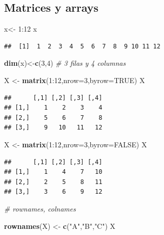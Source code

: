 \documentclass[]{article}
\newenvironment{Shaded}{\begin{snugshade}}{\end{snugshade}}
\newcommand{\KeywordTok}[1]{\textcolor[rgb]{0.13,0.29,0.53}{\textbf{{#1}}}}
\newcommand{\DataTypeTok}[1]{\textcolor[rgb]{0.13,0.29,0.53}{{#1}}}
\newcommand{\DecValTok}[1]{\textcolor[rgb]{0.00,0.00,0.81}{{#1}}}
\newcommand{\StringTok}[1]{\textcolor[rgb]{0.31,0.60,0.02}{{#1}}}
\newcommand{\CommentTok}[1]{\textcolor[rgb]{0.56,0.35,0.01}{\textit{{#1}}}}
\newcommand{\OtherTok}[1]{\textcolor[rgb]{0.56,0.35,0.01}{{#1}}}
\newcommand{\NormalTok}[1]{{#1}}
\numberwithin{equation}{section}
\begin{document}
\subsection{Matrices y arrays}\label{matrices-y-arrays}

\begin{Shaded}
\begin{Highlighting}[]
\NormalTok{x<-}\StringTok{ }\DecValTok{1}\NormalTok{:}\DecValTok{12}
\NormalTok{x}
\end{Highlighting}
\end{Shaded}

\begin{verbatim}
##  [1]  1  2  3  4  5  6  7  8  9 10 11 12
\end{verbatim}

\begin{Shaded}
\begin{Highlighting}[]
\KeywordTok{dim}\NormalTok{(x)<-}\KeywordTok{c}\NormalTok{(}\DecValTok{3}\NormalTok{,}\DecValTok{4}\NormalTok{)  }\CommentTok{# 3 filas y 4 columnas}

\NormalTok{X <-}\StringTok{ }\KeywordTok{matrix}\NormalTok{(}\DecValTok{1}\NormalTok{:}\DecValTok{12}\NormalTok{,}\DataTypeTok{nrow=}\DecValTok{3}\NormalTok{,}\DataTypeTok{byrow=}\OtherTok{TRUE}\NormalTok{)}
\NormalTok{X}
\end{Highlighting}
\end{Shaded}

\begin{verbatim}
##      [,1] [,2] [,3] [,4]
## [1,]    1    2    3    4
## [2,]    5    6    7    8
## [3,]    9   10   11   12
\end{verbatim}

\begin{Shaded}
\begin{Highlighting}[]
\NormalTok{X <-}\StringTok{ }\KeywordTok{matrix}\NormalTok{(}\DecValTok{1}\NormalTok{:}\DecValTok{12}\NormalTok{,}\DataTypeTok{nrow=}\DecValTok{3}\NormalTok{,}\DataTypeTok{byrow=}\OtherTok{FALSE}\NormalTok{)}
\NormalTok{X}
\end{Highlighting}
\end{Shaded}

\begin{verbatim}
##      [,1] [,2] [,3] [,4]
## [1,]    1    4    7   10
## [2,]    2    5    8   11
## [3,]    3    6    9   12
\end{verbatim}

\begin{Shaded}
\begin{Highlighting}[]
\CommentTok{# rownames, colnames}

\KeywordTok{rownames}\NormalTok{(X) <-}\StringTok{ }\KeywordTok{c}\NormalTok{(}\StringTok{"A"}\NormalTok{,}\StringTok{"B"}\NormalTok{,}\StringTok{"C"}\NormalTok{)}
\NormalTok{X}
\end{Highlighting}
\end{Shaded}
\end{document}
